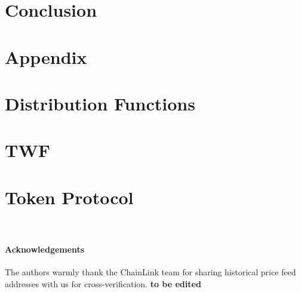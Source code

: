 \documentclass[runningheads]{llncs}
\begin{document}
\section{Conclusion}


\section*{Appendix}
\appendix

\section{Distribution Functions}\label{APP-DistributionFunctions}


\section{TWF}\label{APP-TWF}


\section{Token Protocol}\label{APP-TokenProtocol}






\
\paragraph*{Acknowledgements} 
The authors warmly thank the ChainLink team for sharing historical price feed addresses with us for cross-verification. \textbf{to be edited}

%
%
% 
% 
%



\end{document}
